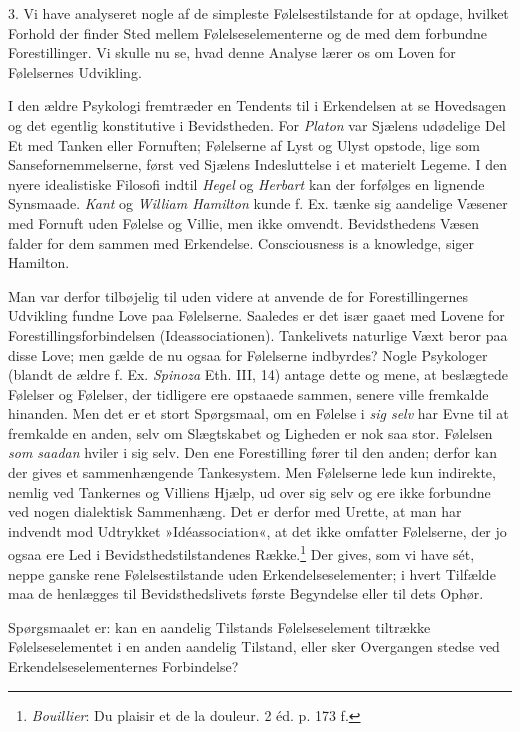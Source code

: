 \documentclass[12pt,a4paper,openany]{book}
\newcommand{\opage}[1]{\marginnote{\footnotesize\textit{[#1]}}}
\begin{document}
3. Vi have analyseret nogle af de simpleste Følelsestilstande for at
opdage, hvilket Forhold der finder Sted mellem Følelseselementerne og de
med dem forbundne Forestillinger. Vi skulle nu se, hvad denne Analyse
lærer os om Loven for Følelsernes Udvikling.

I den ældre Psykologi fremtræder en Tendents til i Erkendelsen at se
Hovedsagen og det egentlig konstitutive i Bevidstheden. For
\emph{Platon} var Sjælens udødelige Del Et med Tanken eller Fornuften;
Følelserne af Lyst og Ulyst opstode, lige som Sansefornemmelserne, først
ved Sjælens Indesluttelse i et materielt Legeme. I den nyere
idealistiske Filosofi indtil \emph{Hegel} og \emph{Herbart} kan der
forfølges en lignende Synsmaade. \emph{Kant} og \emph{William Hamilton}
kunde f. Ex. tænke sig aandelige Væsener med Fornuft uden Følelse og
Villie, men ikke omvendt. Bevidsthedens Væsen falder for dem sammen med
Erkendelse. Consciousness is a knowledge, siger Hamilton.

Man var derfor tilbøjelig til uden videre at anvende de for
Forestillingernes Udvikling fundne Love paa Følelserne. Saaledes er det
især gaaet med Lovene for Forestillingsforbindelsen (Ideassociationen).
Tankelivets naturlige Væxt beror paa disse Love; men gælde de nu ogsaa
for Følelserne indbyrdes? Nogle Psykologer (blandt de ældre f. Ex.
\emph{Spinoza} Eth. III, 14) antage dette og mene, at beslægtede
Følelser og
\opage{289}Følelser, der tidligere ere opstaaede sammen, senere ville
fremkalde hinanden. Men det er et stort Spørgsmaal, om en Følelse i
\emph{sig selv} har Evne til at fremkalde en anden, selv om Slægtskabet
og Ligheden er nok saa stor. Følelsen \emph{som saadan} hviler i sig
selv. Den ene Forestilling fører til den anden; derfor kan der gives et
sammenhængende Tankesystem. Men Følelserne lede kun indirekte, nemlig
ved Tankernes og Villiens Hjælp, ud over sig selv og ere ikke forbundne
ved nogen dialektisk Sammenhæng. Det er derfor med Urette, at man har
indvendt mod Udtrykket »Idéassociation«, at det ikke omfatter
Følelserne, der jo ogsaa ere Led i Bevidsthedstilstandenes
Række.\footnote[1]{\emph{Bouillier}: Du plaisir et de la douleur. 2 éd.
p. 173 f.} Der gives, som vi have sét, neppe ganske rene
Følelsestilstande uden Erkendelseselementer; i hvert Tilfælde maa de
henlægges til Bevidsthedslivets første Begyndelse eller til dets Ophør.

Spørgsmaalet er: kan en aandelig Tilstands Følelseselement tiltrække
Følelseselementet i en anden aandelig Tilstand, eller sker Overgangen
stedse ved Erkendelseselementernes Forbindelse?
\end{document}
